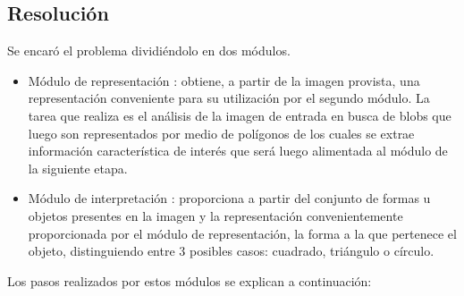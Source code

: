 \documentclass[pdftex,a4paper,10.5pt]{article}
\begin{document}
\subsection{Resoluci\'on}
Se encar\'o el problema dividi\'endolo en dos m\'odulos.
\begin{itemize}
\item 
M\'odulo de representaci\'on \cite{rulot}: obtiene, a partir de la imagen provista, una representaci\'on conveniente para su utilizaci\'on por el segundo m\'odulo. La tarea que realiza es el an\'alisis de la imagen de entrada en busca de blobs \cite{blobs} que luego son representados por medio de pol\'igonos de los cuales se extrae informaci\'on caracter\'istica de inter\'es que ser\'a luego alimentada al m\'odulo de la siguiente etapa.
\item
M\'odulo de interpretaci\'on \cite{rulot}: proporciona a partir del conjunto de formas u objetos presentes en la imagen y la representaci\'on convenientemente proporcionada por el m\'odulo de representaci\'on, la forma a la que pertenece el objeto, distinguiendo entre 3 posibles casos: cuadrado, tri\'angulo o c\'irculo.
\end{itemize}



Los pasos realizados por estos m\'odulos se explican a continuaci\'on:
\end{document}
